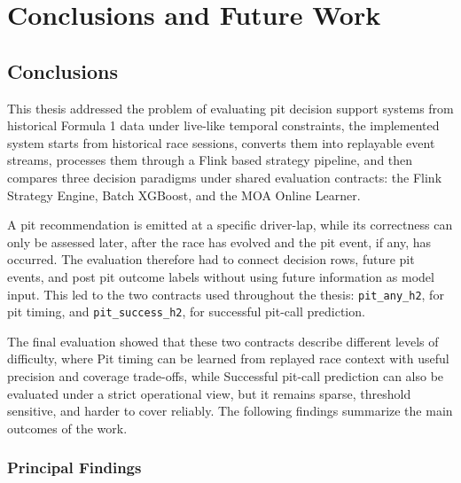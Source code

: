 \chapter{Conclusions and Future Work}
\label{ch:conclusions}

\section{Conclusions}

This thesis addressed the problem of evaluating pit decision support systems from historical Formula 1 data under live-like temporal constraints, the implemented system
starts from historical race sessions, converts them into replayable event streams, processes them through a Flink based strategy pipeline, and then compares three decision
paradigms under shared evaluation contracts: the Flink Strategy Engine, Batch XGBoost, and the MOA Online Learner.

A pit recommendation is emitted at a specific driver-lap, while its correctness can only be assessed later,
after the race has evolved and the pit event, if any, has occurred. The evaluation therefore had to connect decision rows, future pit events, and post pit outcome labels
without using future information as model input. This led to the two contracts used throughout the thesis: \texttt{pit\_any\_h2}, for pit timing, and \texttt{pit\_success\_h2},
for successful pit-call prediction.

The final evaluation showed that these two contracts describe different levels of difficulty, where Pit timing can be learned from replayed race context with useful precision
and coverage trade-offs, while Successful pit-call prediction can also be evaluated under a strict operational view, but it remains sparse, threshold sensitive, and harder
to cover reliably. The following findings summarize the main outcomes of the work.

\subsection{Principal Findings}

